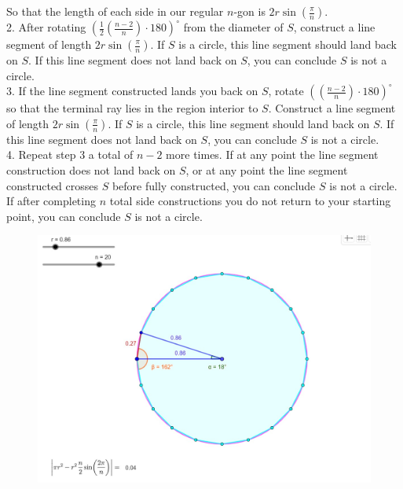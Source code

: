 \documentclass[11pt]{article}
\begin{document}
So that the length of each side in our regular \(n\)-gon is \(2r\sin\left( \frac{\pi}{n} \right)\).
\\[1\baselineskip]
2. After rotating \((\frac{1}{2}(\frac{n-2}{n})\cdot 180)^{\circ}\) from the diameter of \(S\), construct a line segment of length \(2r\sin\left( \frac{\pi}{n} \right)\).  If \(S\) is a circle, this line segment should land back on \(S\).  If this line segment does not land back on \(S\), you can conclude \(S\) is not a circle.
\\[1\baselineskip]
3. If the line segment constructed lands you back on \(S\), rotate \(((\frac{n-2}{n})\cdot 180)^{\circ}\) so that the terminal ray lies in the region interior to \(S\).  Construct a line segment of length \(2r\sin\left( \frac{\pi}{n} \right)\).  If \(S\) is a circle, this line segment should land back on \(S\).  If this line segment does not land back on \(S\), you can conclude \(S\) is not a circle. 
\\[1\baselineskip]
4. Repeat step 3 a total of \(n-2\) more times.  If at any point the line segment construction does not land back on \(S\), or at any point the line segment constructed crosses \(S\) before fully constructed, you can conclude \(S\) is not a circle.  If after completing \(n\) total side constructions you do not return to your starting point, you can conclude \(S\) is not a circle.
\begin{center}
	\begin{figure}[h]
		\includegraphics[scale=0.29]{circle_7.jpg}
	\end{figure}
\end{center}
\end{document}
